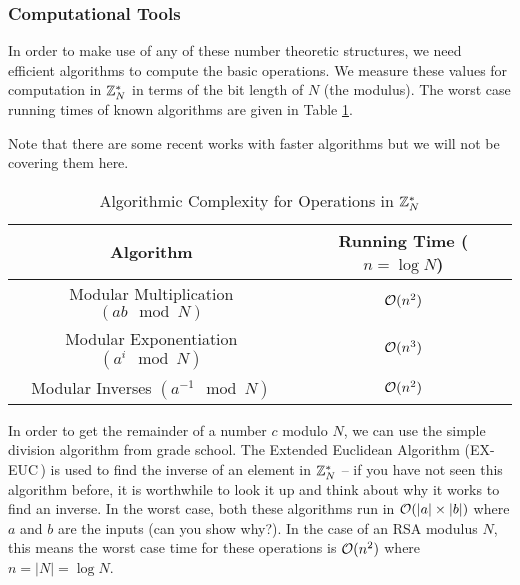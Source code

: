 \subsubsection{Computational Tools}
In order to make use of any of these number theoretic structures, we need efficient algorithms to compute the basic operations. We measure these values for computation in ${{\mathbb Z}}^*_N$ in terms of the bit length of $N$ (the modulus). The worst case running times of known algorithms are given in Table \ref{table:znAlgs}. 
\begin{remark}
Note that there are some recent works with faster algorithms but we will not be covering them here.
\end{remark}
\begin{table}[H]
\centering
\begin{tabular}{c | c}
\textbf{Algorithm} & \textbf{Running Time} ($n = \log N$) \\ \hline
Modular Multiplication $(ab \mod N)$ & ${\cal O}(n^2)$ \\
Modular Exponentiation $(a^i \mod N)$ & ${\cal O}(n^3)$ \\
Modular Inverses $(a^{-1}\mod N)$ & ${\cal O}(n^2)$
\end{tabular}
\caption{Algorithmic Complexity for Operations in ${{\mathbb Z}}_N^*$}
\label{table:znAlgs}
\end{table}

\newcommand{\euc}{\textnormal{EUC}\,}
\newcommand{\eeuc}{\textnormal{EX-EUC}\,}

In order to get the remainder of a number $c$ modulo $N$, we can use the simple division algorithm from grade school. The Extended Euclidean Algorithm (\eeuc) is used to find the inverse of an element in ${{\mathbb Z}}^*_N$ -- if you have not seen this algorithm before, it is worthwhile to look it up and think about why it works to find an inverse.  In the worst case, both these algorithms run in ${\cal O}(|a|\times |b|)$ where $a$ and $b$ are the inputs (can you show why?). In the case of an RSA modulus $N$, this means the worst case time for these operations is ${\cal O}(n^2)$ where $n = |N| = \log N$. 

%

